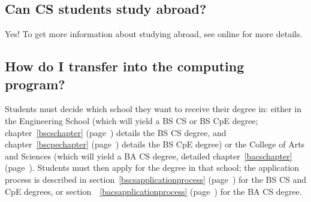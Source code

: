 
\subsection{Can CS students study abroad?}

Yes! To get more information about studying abroad, see
online
for more details.
 
\subsection{How do I transfer into the computing program?}

Students must decide which school they want to receive their degree
in: either in the Engineering School (which will yield a BS CS or BS
CpE degree; chapter~\ref{bscschapter} (page~\pageref{bscschapter})
details the BS CS degree, and chapter~\ref{bscpechapter}
(page~\pageref{bscpechapter}) details the BS CpE degree) or the
College of Arts and Sciences (which will yield a BA CS degree,
detailed chapter~\ref{bacschapter} (page~\pageref{bacschapter}).
Students must then apply for the degree in that school; the
application process is described in
section~\ref{bscsapplicationprocess}
(page~\pageref{bscsapplicationprocess}) for the BS CS and CpE degrees,
or section~~\ref{bacsapplicationprocess}
(page~\pageref{bacsapplicationprocess}) for the BA CS degree.

%


